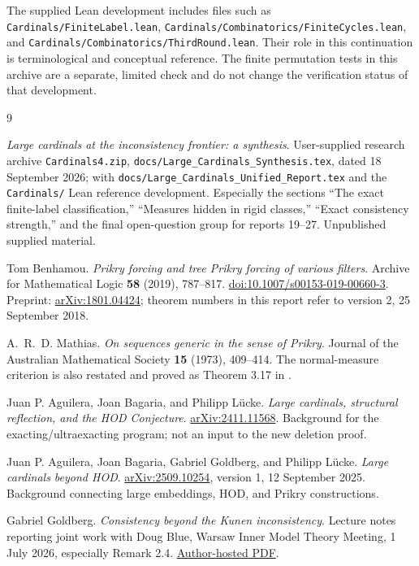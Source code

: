 \documentclass[11pt,letterpaper]{article}
\theoremstyle{definition}
\numberwithin{equation}{section}
\begin{document}
The supplied Lean development includes files such as
\nolinkurl{Cardinals/FiniteLabel.lean},
\nolinkurl{Cardinals/Combinatorics/FiniteCycles.lean}, and
\nolinkurl{Cardinals/Combinatorics/ThirdRound.lean}. Their role in this
continuation is terminological and conceptual reference. The finite
permutation tests in this archive are a separate, limited check and do
not change the verification status of that development.

\begin{thebibliography}{9}
\small

\emph{Large cardinals at the inconsistency frontier: a synthesis}.
User-supplied research archive \nolinkurl{Cardinals4.zip},
\nolinkurl{docs/Large_Cardinals_Synthesis.tex}, dated 18 September 2026;
with \nolinkurl{docs/Large_Cardinals_Unified_Report.tex} and the
\nolinkurl{Cardinals/} Lean reference development. Especially the sections
``The exact finite-label classification,'' ``Measures hidden in rigid
classes,'' ``Exact consistency strength,'' and the final open-question
group for reports 19--27. Unpublished supplied material.

Tom Benhamou.
\emph{Prikry forcing and tree Prikry forcing of various filters}.
Archive for Mathematical Logic \textbf{58} (2019), 787--817.
\href{https://doi.org/10.1007/s00153-019-00660-3}{doi:10.1007/s00153-019-00660-3}.
Preprint: \href{https://arxiv.org/abs/1801.04424}{arXiv:1801.04424};
theorem numbers in this report refer to version 2, 25 September 2018.

A.~R.~D. Mathias.
\emph{On sequences generic in the sense of Prikry}.
Journal of the Australian Mathematical Society \textbf{15} (1973),
409--414. The normal-measure criterion is also restated and proved as
Theorem 3.17 in \cite{benhamou}.

Juan P. Aguilera, Joan Bagaria, and Philipp L\"ucke.
\emph{Large cardinals, structural reflection, and the HOD Conjecture}.
\href{https://arxiv.org/abs/2411.11568}{arXiv:2411.11568}.
Background for the exacting/ultraexacting program; not an input to the
new deletion proof.

Juan P. Aguilera, Joan Bagaria, Gabriel Goldberg, and Philipp L\"ucke.
\emph{Large cardinals beyond HOD}.
\href{https://arxiv.org/abs/2509.10254}{arXiv:2509.10254}, version 1,
12 September 2025.
Background connecting large embeddings, HOD, and Prikry constructions.

Gabriel Goldberg.
\emph{Consistency beyond the Kunen inconsistency}.
Lecture notes reporting joint work with Doug Blue,
Warsaw Inner Model Theory Meeting, 1 July 2026,
especially Remark 2.4.
\href{https://math.berkeley.edu/~goldberg/Slides/CoverExact.pdf}{Author-hosted PDF}.

\end{thebibliography}
\end{document}
